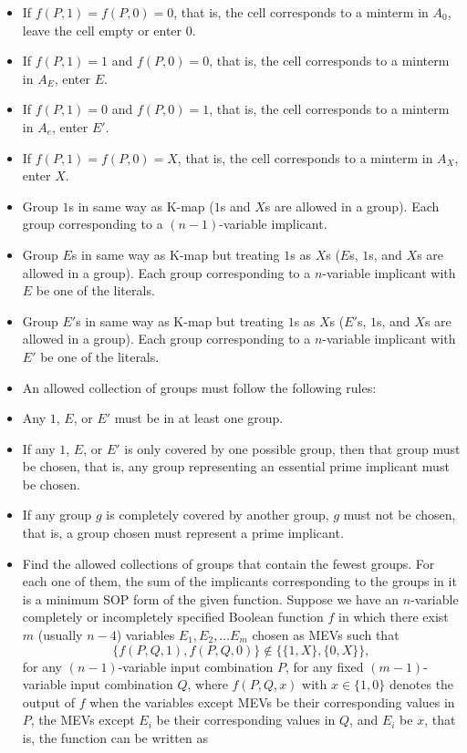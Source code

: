 \documentclass[a4paper,12pt]{article}
\begin{document}
\begin{itemize}
\begin{itemize}
\begin{itemize}
\begin{itemize}
\begin{itemize}
\begin{itemize}
\begin{itemize}
\item If $f(P,1)=f(P,0)=0$, that is, the cell corresponds to a minterm in $A_0$, leave the cell empty or enter $0$.
\item If $f(P,1)=1$ and $f(P,0)=0$, that is, the cell corresponds to a minterm in $A_E$, enter $E$.
\item If $f(P,1)=0$ and $f(P,0)=1$, that is, the cell corresponds to a minterm in $A_e$, enter $E'$.
\item If $f(P,1)=f(P,0)=X$, that is, the cell corresponds to a minterm in $A_X$, enter $X$.
\eit
\item Group $1$s in same way as K-map ($1$s and $X$s are allowed in a group). Each group corresponding to a $(n-1)$-variable implicant.
\item Group $E$s in same way as K-map but treating $1$s as $X$s ($E$s, $1$s, and $X$s are allowed in a group). Each group corresponding to a $n$-variable implicant with $E$ be one of the literals.
\item Group $E'$s in same way as K-map but treating $1$s as $X$s ($E'$s, $1$s, and $X$s are allowed in a group). Each group corresponding to a $n$-variable implicant with $E'$ be one of the literals.
\item An allowed collection of groups must follow the following rules:
\bit
\item Any $1$, $E$, or $E'$ must be in at least one group.
\item If any $1$, $E$, or $E'$ is only covered by one possible group, then that group must be chosen, that is, any group representing an essential prime implicant must be chosen.
\item If any group $g$ is completely covered by another group, $g$ must not be chosen, that is, a group chosen must represent a prime implicant.
\eit
\item Find the allowed collections of groups that contain the fewest groups. For each one of them, the sum of the implicants corresponding to the groups in it is a minimum SOP form of the given function.
\een
{}
Suppose we have an $n$-variable completely or incompletely specified Boolean function $f$ in which there exist $m$ (usually $n-4$) variables $E_1,E_2,\ldots E_m$ chosen as MEVs such that
\[\{f(P,Q,1),f(P,Q,0)\}\notin\{\{1,X\},\{0,X\}\},\]
for any $(n-1)$-variable input combination $P$, for any fixed $(m-1)$-variable input combination $Q$, where $f(P,Q,x)$ with $x\in\{1,0\}$ denotes the output of $f$ when the variables except MEVs be their corresponding values in $P$, the MEVs except $E_i$ be their corresponding values in $Q$, and $E_i$ be $x$, that is, the function can be written as

\end{itemize}
\end{itemize}
\end{itemize}
\end{itemize}
\end{itemize}
\end{itemize}
\end{itemize}
\end{document}
